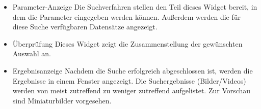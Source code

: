 \begin{itemize}
\item Parameter-Anzeige \newline
Die \gls{Suchverfahren} stellen den Teil dieses \gls{Widget} bereit, in dem die Parameter eingegeben werden können. Außerdem werden die für diese Suche verfügbaren Datensätze angezeigt.

\item Überprüfung \newline 
Dieses \gls{Widget} zeigt die Zusammenstellung der gewünschten Auswahl an.

\item Ergebnisanzeige \newline
Nachdem die Suche erfolgreich abgeschlossen ist, werden die Ergebnisse in einem Fenster angezeigt. Die Suchergebnisse (Bilder/Videos) werden von meist zutreffend zu weniger zutreffend aufgelistet. Zur Vorschau sind Miniaturbilder vorgesehen.

\end{itemize}
